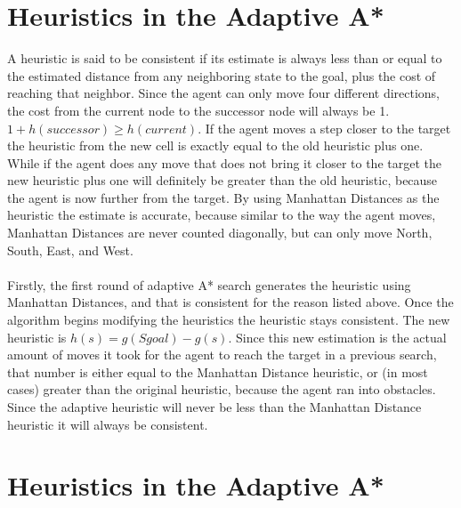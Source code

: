 \documentclass[12pt]{article}
\begin{document}
\section{Heuristics in the Adaptive A*}

A heuristic is said to be consistent if its estimate is always less than or equal to the estimated distance from any neighboring state to the goal, plus the cost of reaching that neighbor.  Since the agent can only move four different directions, the cost from the current node to the successor node will always be 1. $1 + h(successor) \geq h(current)$. If the agent moves a step closer to the target the heuristic from the new cell is exactly equal to the old heuristic plus one. While if the agent does any move that does not bring it closer to the target the new heuristic plus one will definitely be greater than the old heuristic, because the agent is now further from the target. By using Manhattan Distances as the heuristic the estimate is accurate, because similar to the way the agent moves, Manhattan Distances are never counted diagonally, but can only move North, South, East, and West. \\
\\
Firstly, the first round of adaptive A* search generates the heuristic using Manhattan Distances, and that is consistent for the reason listed above. Once the algorithm begins modifying the heuristics the heuristic stays consistent. The new heuristic is $h(s) = g(Sgoal) - g(s)$. Since this new estimation is the actual amount of moves it took for the agent to reach the target in a previous search, that number is either equal to the Manhattan Distance heuristic, or (in most cases) greater than the original heuristic, because the agent ran into obstacles. Since the adaptive heuristic will never be less than the Manhattan Distance heuristic it will always be consistent. \\

\section{Heuristics in the Adaptive A*}
\end{document}
